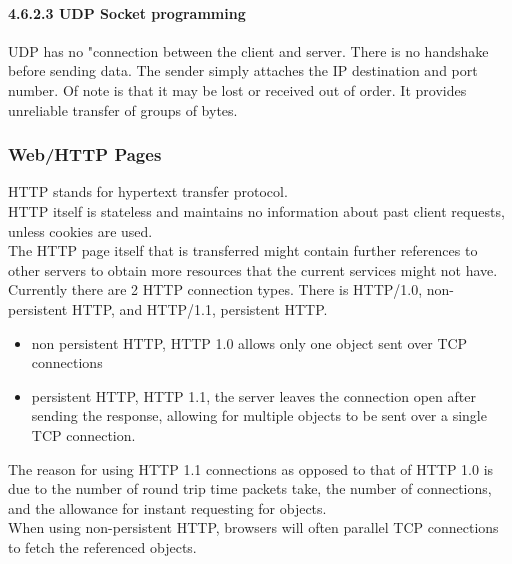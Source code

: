 \documentclass{article}
\begin{document}
\paragraph{4.6.2.3 UDP Socket programming}
UDP has no "connection between the client and server. There is no handshake before sending data. The sender simply attaches the IP destination and port number. Of note is that it may be lost or received out of order. It provides unreliable transfer of groups of bytes.
\subsubsection{Web/HTTP Pages}
    HTTP stands for hypertext transfer protocol. \\
    HTTP itself is stateless and maintains no information about past client requests, unless cookies are used.\\
    The HTTP page itself that is transferred might contain further references to other servers to obtain more resources that the current services might not have.\\
    Currently there are 2 HTTP connection types. There is HTTP/1.0, non-persistent HTTP, and HTTP/1.1, persistent HTTP.
    \begin{itemize}
        \item non persistent HTTP, HTTP 1.0 allows only one object sent over TCP connections
        \item persistent HTTP, HTTP 1.1, the server leaves the connection open after sending the response, allowing for multiple objects to be sent over a single TCP connection.
    \end{itemize}
    The reason for using HTTP 1.1 connections as opposed to that of HTTP 1.0 is due to the number of round trip time packets take, the number of connections, and the allowance for instant requesting for objects.\\
    When using non-persistent HTTP, browsers will often parallel TCP connections to fetch the referenced objects.
\end{document}

